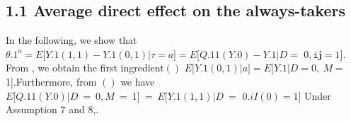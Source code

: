 \documentclass{article}
\begin{document}
\subsection*{1.1 Average direct effect on the always-takers}


In the following, we show that$\theta . { 1 } ^ { a } = E [ Y . { 1 } ( 1, 1 ) \! - \! Y . { 1 } ( 0, 1 ) | \tau = a ] = E [ Q . { 1 1 } ( Y . { 0 } ) \! - \! Y . { 1 } | D =$
$0, \mathtt { i } \mathbf { j } = 1 ]$. From , we obtain the first ingredient$\left ( \right )$ $E [ Y . { 1 } ( 0, 1 ) | a ] = E [ Y . { 1 } | D = 0, ~ M =$
1].Furthermore, from $( )$ we  have $E [ Q . { 1 1 } ( Y . { 0 } ) | D ~ = ~ 0, M ~ = ~ 1 ] ~ = ~ E [ Y . { 1 } ( 1, 1 ) | D ~ =$
$0. i I ( 0 ) = 1 ]$ Under Assumption 7 and 8,.
\end{document}
